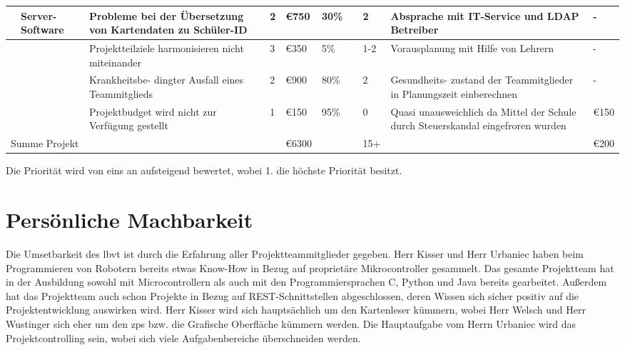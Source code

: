 \begin{center}
\begin{tiny}
\begin{tabularx}{\textwidth}{|l|p{1.1cm}|X|l|l|l|p{0.5cm}|l|X|l|}
    \hline
    [0302]& Server-Software & Probleme bei der Übersetzung von Kartendaten zu Schüler-ID & 2 & €750 & 30\% & & 2 & Absprache mit IT-Service und LDAP Betreiber & -\\
    \hline
    & & Projektteilziele harmonisieren nicht miteinander & 3 & €350 & 5\% & & 1-2 & Vorausplanung mit Hilfe von Lehrern & -\\
    \hline
    & & Krankheitsbe- dingter Ausfall eines Teammitglieds & 2 & €900 & 80\% & & 2 & Gesundheits- zustand der Teammitglieder in Planungszeit einberechnen & -\\
    \hline
    & & Projektbudget wird nicht zur Verfügung gestellt & 1 & €150 & 95\% & & 0 & Quasi unausweichlich da Mittel der Schule durch Steuerskandal eingefroren wurden & €150\\
    \hline
    \multicolumn{2}{|l|}{Summe Projekt} & & & €6300 & & & 15+ & &€200\\
    \hline
\end{tabularx}
\end{tiny}
\end{center}
\endgroup
\begin{flushleft}
Die Priorität wird von eins an aufsteigend bewertet, wobei 1. die höchste Priorität besitzt.
\end{flushleft}
\newpage

\section{Persönliche Machbarkeit}
Die Umsetbarkeit des \gls{lbvt} ist durch die Erfahrung aller Projektteammitglieder gegeben. Herr Kisser und Herr Urbaniec haben beim Programmieren von Robotern bereits etwas Know-How in Bezug auf proprietäre Mikrocontroller gesammelt. Das gesamte Projektteam hat in der Ausbildung sowohl mit Microcontrollern als auch mit den Programmiersprachen C, Python und Java bereits gearbeitet. Außerdem hat das Projektteam auch schon Projekte in Bezug auf REST-Schnittstellen abgeschlossen, deren Wissen sich sicher positiv auf die Projektentwicklung auswirken wird. Herr Kisser wird sich hauptsächlich um den Kartenleser kümmern, wobei Herr Welsch und Herr Wustinger sich eher um den \gls{zps} bzw. die Grafische Oberfläche kümmern werden. Die Hauptaufgabe vom Herrn Urbaniec wird das Projektcontrolling sein, wobei sich viele Aufgabenbereiche überschneiden werden.

